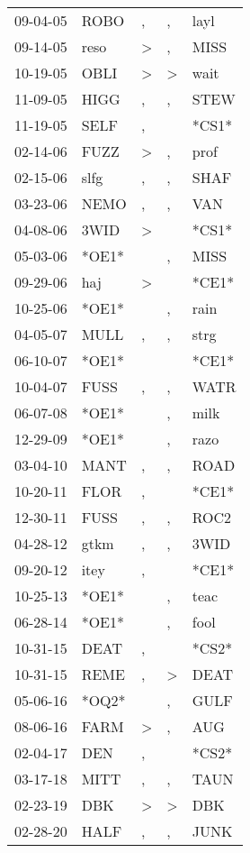 \begin{supertabular}{lllll}
 09-04-05 &   ROBO &             , &             , &   layl \\
 09-14-05 &   reso &  \textgreater &             , &   MISS \\
 10-19-05 &   OBLI &  \textgreater &  \textgreater &   wait \\
 11-09-05 &   HIGG &             , &             , &   STEW \\
 11-19-05 &   SELF &             , &               &  *CS1* \\
 02-14-06 &   FUZZ &  \textgreater &             , &   prof \\
 02-15-06 &   slfg &             , &             , &   SHAF \\
 03-23-06 &   NEMO &             , &             , &    VAN \\
 04-08-06 &   3WID &  \textgreater &               &  *CS1* \\
 05-03-06 &  *OE1* &               &             , &   MISS \\
 09-29-06 &    haj &  \textgreater &               &  *CE1* \\
 10-25-06 &  *OE1* &               &             , &   rain \\
 04-05-07 &   MULL &             , &             , &   strg \\
 06-10-07 &  *OE1* &               &               &  *CE1* \\
 10-04-07 &   FUSS &             , &             , &   WATR \\
 06-07-08 &  *OE1* &               &             , &   milk \\
 12-29-09 &  *OE1* &               &             , &   razo \\
 03-04-10 &   MANT &             , &             , &   ROAD \\
 10-20-11 &   FLOR &             , &               &  *CE1* \\
 12-30-11 &   FUSS &             , &             , &   ROC2 \\
 04-28-12 &   gtkm &             , &             , &   3WID \\
 09-20-12 &   itey &             , &               &  *CE1* \\
 10-25-13 &  *OE1* &               &             , &   teac \\
 06-28-14 &  *OE1* &               &             , &   fool \\
 10-31-15 &   DEAT &             , &               &  *CS2* \\
 10-31-15 &   REME &             , &  \textgreater &   DEAT \\
 05-06-16 &  *OQ2* &               &             , &   GULF \\
 08-06-16 &   FARM &  \textgreater &             , &    AUG \\
 02-04-17 &    DEN &             , &               &  *CS2* \\
 03-17-18 &   MITT &             , &             , &   TAUN \\
 02-23-19 &    DBK &  \textgreater &  \textgreater &    DBK \\
 02-28-20 &   HALF &             , &             , &   JUNK \\
\end{supertabular}
